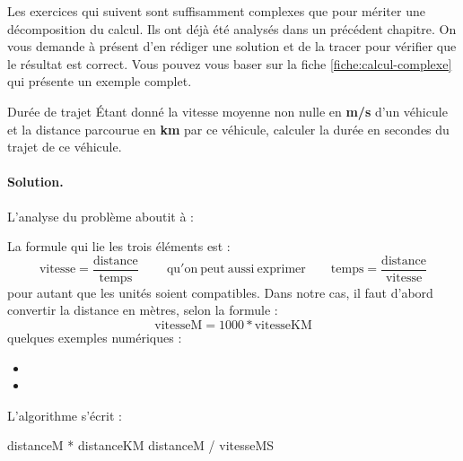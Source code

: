 			Les exercices qui suivent sont suffisamment complexes
			que pour mériter une décomposition du calcul.
			Ils ont déjà été analysés dans un précédent chapitre.
			On vous demande à présent d’en rédiger une solution
			et de la tracer pour vérifier que le résultat est correct.
			Vous pouvez vous baser sur la fiche \vref{fiche:calcul-complexe}
			qui présente un exemple complet.
				
			\begin{Exercice}{Durée de trajet}
				\label{algo:durée}
				Étant donné la vitesse moyenne non nulle en \textbf{m/s}
				d’un véhicule et la distance parcourue en \textbf{km} par ce véhicule,
				calculer la durée en secondes du trajet de ce véhicule.
				
				\paragraph{Solution.}
				L’analyse du problème aboutit à :
				\begin{center}
				\end{center}
				La formule qui lie les trois éléments est :
				\[
					\mathrm{vitesse} = \frac{\mathrm{distance}}{\mathrm{temps}}
					\qquad \mathrm{\ qu'on\ peut\ aussi\ exprimer}\qquad
					\mathrm{temps} = \frac{\mathrm{distance}}{\mathrm{vitesse}}					
				\]
				pour autant que les unités soient compatibles.
				Dans notre cas, il faut d’abord convertir
				la distance en mètres, selon la formule :
				\[
					\mathrm{vitesseM} = 1000 * \mathrm{vitesseKM}					
				\]
				quelques exemples numériques :
				\begin{multicols}{2}
					\begin{itemize}
					\item {}
					\item {}
					\end{itemize}
				\end{multicols}
				L’algorithme s’écrit :
				\begin{LDA}[1]
						\Let distanceM  * distanceKM
						\Return distanceM / vitesseMS
					\EndAlgo
				\end{LDA}
				

\end{Exercice}
